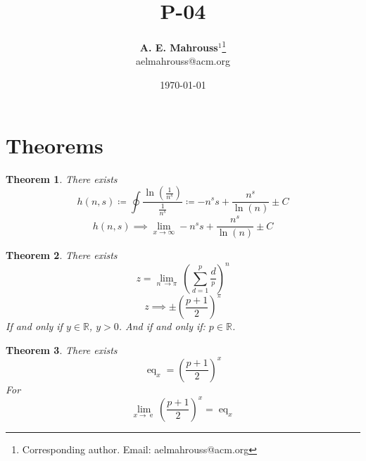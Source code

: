 \documentclass[10pt, twocolumn]{article}
\title{%
  \vspace{-1.5em}%
  \large\textbf{P-04}%
}
\author{%
  \textbf{A. E. Mahrouss}$^{1}$\thanks{Corresponding author. Email: aelmahrouss@acm.org}
  \\aelmahrouss@acm.org\\[0.4em]
}
\date{%
  \small \today
}
\theoremstyle{plain}
\newtheorem{theorem}{Theorem}[section]
\theoremstyle{definition}
\theoremstyle{remark}
\begin{document}

\twocolumn[{%
  \maketitle
  \vspace{-0.5em}
  \vspace{0.8em}
  \rule{\linewidth}{0.4pt}
  \vspace{1em}
}]


\section{Theorems}
\begin{theorem}
  There exists
  \begin{equation}
    h(n, s) \coloneqq \oint \frac{\ln(\frac{1}{n^s})}{\frac{1}{n^s}}  \coloneq -n^s s+\frac{n^s}{\ln \left(n\right)}\pm C
  \end{equation}
  \begin{equation}
    h(n, s) \implies \lim _{x\to \infty } -n^s s+\frac{n^s}{\ln \left(n\right)}\pm C
  \end{equation}
\end{theorem}

\begin{theorem}
  There exists
  \begin{equation}
    z = \lim _{n\:\to \pi }\:(\sum_{d=1}^{p} \frac{d}{^p})^{n}
  \end{equation}
  \begin{equation}
    z \implies \pm \left(\frac{p+1}{2}\right)^{\pi }
  \end{equation}
  If and only if $y \in \mathbb{R}$, $y > 0$. And if and only if: $p \in \mathbb{R}$.
\end{theorem}

\begin{theorem}
  There exists
  \begin{equation}
    \operatorname{eq}_{x} = \left(\frac{p+1}{2}\right)^{x}
  \end{equation}
  For
  \begin{equation}
    \lim_{x \to \operatorname{e}} \left(\frac{p+1}{2}\right)^{x} = \operatorname{eq}_{x}
  \end{equation}
\end{theorem}
\end{document}
